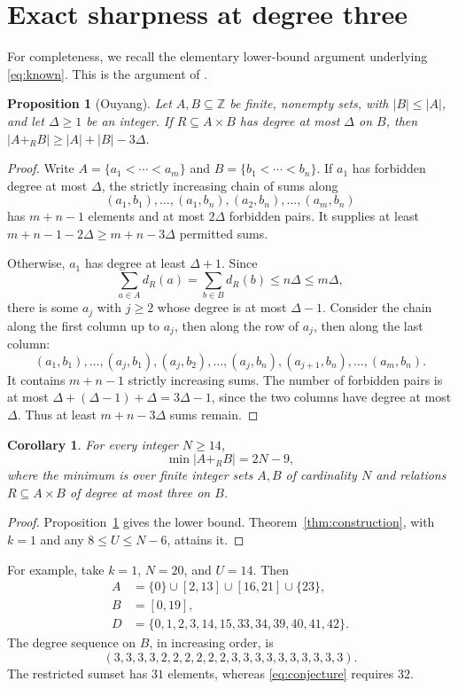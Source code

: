 \documentclass[11pt]{article}
\newtheorem{corollary}[theorem]{Corollary}
\newtheorem{proposition}[theorem]{Proposition}
\newcommand{\Z}{\mathbb Z}
\newcommand{\res}{\mathbin{+_{R}}}
\begin{document}
\section{Exact sharpness at degree three}
For completeness, we recall the elementary lower-bound argument underlying \eqref{eq:known}. This is the argument of \cite[Theorem 1.5(i)]{Ouyang}.

\begin{proposition}[Ouyang]\label{prop:known}
Let $A,B\subseteq\Z$ be finite, nonempty sets, with $|B|\leq|A|$, and let $\Delta\geq1$ be an integer. If $R\subseteq A\times B$ has degree at most $\Delta$ on $B$, then $|A\res B|\geq |A|+|B|-3\Delta$.
\end{proposition}
\begin{proof}
Write $A=\{a_1<\cdots<a_m\}$ and $B=\{b_1<\cdots<b_n\}$. If $a_1$ has forbidden degree at most $\Delta$, the strictly increasing chain of sums along
\[
 (a_1,b_1),\ldots,(a_1,b_n),(a_2,b_n),\ldots,(a_m,b_n)
\]
has $m+n-1$ elements and at most $2\Delta$ forbidden pairs. It supplies at least $m+n-1-2\Delta\geq m+n-3\Delta$ permitted sums.

Otherwise, $a_1$ has degree at least $\Delta+1$. Since
\[
 \sum_{a\in A}d_R(a)=\sum_{b\in B}d_R(b)\leq n\Delta\leq m\Delta,
\]
there is some $a_j$ with $j\geq2$ whose degree is at most $\Delta-1$. Consider the chain along the first column up to $a_j$, then along the row of $a_j$, then along the last column:
\[
 (a_1,b_1),\ldots,(a_j,b_1),
 (a_j,b_2),\ldots,(a_j,b_n),
 (a_{j+1},b_n),\ldots,(a_m,b_n).
\]
It contains $m+n-1$ strictly increasing sums. The number of forbidden pairs is at most $\Delta+(\Delta-1)+\Delta=3\Delta-1$, since the two columns have degree at most $\Delta$. Thus at least $m+n-3\Delta$ sums remain.
\end{proof}

\begin{corollary}\label{cor:exact}
For every integer $N\geq14$,
\[
 \min |A\res B|=2N-9,
\]
where the minimum is over finite integer sets $A,B$ of cardinality $N$ and relations $R\subseteq A\times B$ of degree at most three on $B$.
\end{corollary}
\begin{proof}
Proposition~\ref{prop:known} gives the lower bound. Theorem~\ref{thm:construction}, with $k=1$ and any $8\leq U\leq N-6$, attains it.
\end{proof}

For example, take $k=1$, $N=20$, and $U=14$. Then
\begin{align*}
 A&=\{0\}\cup[2,13]\cup[16,21]\cup\{23\},\\
 B&=[0,19],\\
 D&=\{0,1,2,3,14,15,33,34,39,40,41,42\}.
\end{align*}
The degree sequence on $B$, in increasing order, is
\[
 (3,3,3,3,2,2,2,2,2,2,3,3,3,3,3,3,3,3,3,3).
\]
The restricted sumset has $31$ elements, whereas \eqref{eq:conjecture} requires $32$.
\end{document}
